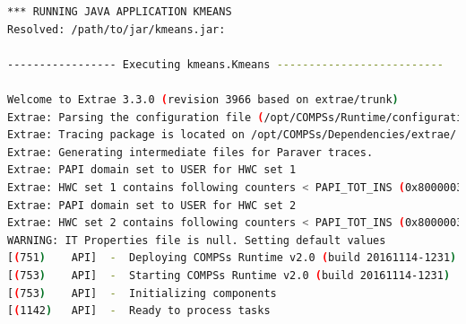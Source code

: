 \begin{lstlisting}[language=bash]
*** RUNNING JAVA APPLICATION KMEANS
Resolved: /path/to/jar/kmeans.jar:

----------------- Executing kmeans.Kmeans --------------------------

Welcome to Extrae 3.3.0 (revision 3966 based on extrae/trunk)
Extrae: Parsing the configuration file (/opt/COMPSs/Runtime/configuration/xml/tracing/extrae_basic.xml) begins
Extrae: Tracing package is located on /opt/COMPSs/Dependencies/extrae/
Extrae: Generating intermediate files for Paraver traces.
Extrae: PAPI domain set to USER for HWC set 1
Extrae: HWC set 1 contains following counters < PAPI_TOT_INS (0x80000032) PAPI_TOT_CYC (0x8000003b) PAPI_LD_INS (0x80000035) PAPI_SR_INS (0x80000036) > - changing every 500000000 nanoseconds
Extrae: PAPI domain set to USER for HWC set 2
Extrae: HWC set 2 contains following counters < PAPI_TOT_INS (0x80000032) PAPI_TOT_CYC (0x8000003b) PAPI_LD_INS (0x80000035) PAPI_SR_INS (0x80000036) PAPI_L2_DCM (0x80000002) > - changing every 500000000 nanoseconds
WARNING: IT Properties file is null. Setting default values
[(751)    API]  -  Deploying COMPSs Runtime v2.0 (build 20161114-1231)
[(753)    API]  -  Starting COMPSs Runtime v2.0 (build 20161114-1231)
[(753)    API]  -  Initializing components
[(1142)   API]  -  Ready to process tasks


\end{lstlisting}
